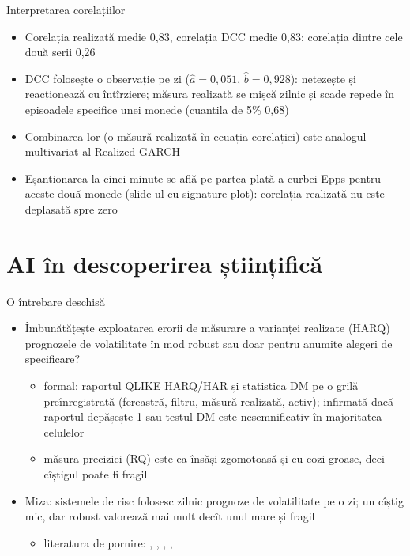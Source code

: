 \begin{frame}{Interpretarea corelațiilor}
\itemsize{\small}
\begin{itemize}
    \item Corelația realizată medie 0{,}83, corelația DCC medie 0{,}83; corelația dintre cele două serii 0{,}26
    \item DCC folosește o observație pe zi ($\hat a = 0{,}051$, $\hat b = 0{,}928$): netezește și reacționează cu întîrziere; măsura realizată se mișcă zilnic și scade repede în episoadele specifice unei monede (cuantila de 5\% 0{,}68)
    \item Combinarea lor (o măsură realizată în ecuația corelației) este analogul multivariat al Realized GARCH
    \item Eșantionarea la cinci minute se află pe partea plată a curbei Epps pentru aceste două monede (slide-ul cu signature plot): corelația realizată nu este deplasată spre zero
\end{itemize}
\end{frame}


\section{AI în descoperirea științifică}

\begin{frame}{O întrebare deschisă}
\itemsize{\small}
\begin{itemize}
    \item Îmbunătățește exploatarea erorii de măsurare a varianței realizate (HARQ) prognozele de volatilitate în mod robust sau doar pentru anumite alegeri de specificare?
    \begin{itemize}
        \item formal: raportul QLIKE HARQ/HAR și statistica DM pe o grilă preînregistrată (fereastră, filtru, măsură realizată, activ); infirmată dacă raportul depășește 1 sau testul DM este nesemnificativ în majoritatea celulelor
        \item măsura preciziei (RQ) este ea însăși zgomotoasă și cu cozi groase, deci cîștigul poate fi fragil
    \end{itemize}
    \item Miza: sistemele de risc folosesc zilnic prognoze de volatilitate pe o zi; un cîștig mic, dar robust valorează mai mult decît unul mare și fragil
    \begin{itemize}
        \item literatura de pornire: , , , , 
    \end{itemize}
\end{itemize}
\end{frame}


